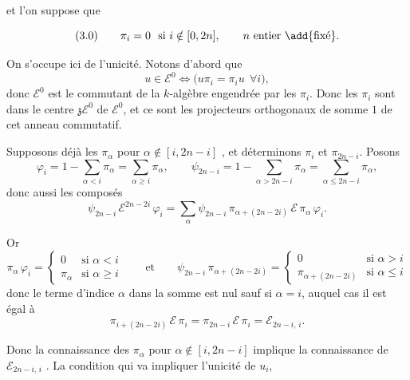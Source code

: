 
\struck{\ill{}} et  l'on suppose que

\[ (3.0) \qquad \pi_{i} = 0 \ \text{ si } i \notin [0, 2n], \qquad n \ \text{entier \add{fixé}} . \]

 On s'occupe ici de l'unicité.  Notons d'abord que
\[ u \in \mathcal{E}^{0} \iff \bigl( u \pi_{i} = \pi_{i} u \ \ \forall i \bigr) , \]
donc $\mathcal{E}^{0}$ est le commutant de la $k$-algèbre engendrée par les
$\pi_{i}$. Donc les $\pi_{i}$ sont dans le centre
$\mathfrak{z}\mathcal{E}^{0}$ de $\mathcal{E}^{0}$, et ce sont les projecteurs
 orthogonaux de somme $1$ de cet anneau commutatif.

Supposons  déjà les $\pi_{\alpha}$ pour
$\alpha \notin [i, 2n-i]$ , et déterminons $\pi_{i}$ et
$\pi_{2n-i}$. Posons
\[ \varphi_{i} = 1 - \sum_{\alpha < i} \pi_{\alpha} = \sum_{\alpha \geqslant i} \pi_{\alpha} , \qquad \psi_{2n-i} = 1 - \sum_{\alpha > 2n-i} \pi_{\alpha} = \sum_{\alpha \leqslant 2n-i} \pi_{\alpha} , \]
donc aussi les composés
\[ \psi_{2n-i}\, \mathcal{E}^{2n-2i}\, \varphi_{i} = \sum_{\alpha} \psi_{2n-i}\, \pi_{\alpha + (2n-2i)}\, \mathcal{E}\, \pi_{\alpha}\, \varphi_{i} . \]


Or
\[ \pi_{\alpha}\, \varphi_{i} = \begin{cases} 0 & \text{si } \alpha < i \\ \pi_{\alpha} & \text{si } \alpha \geqslant i \end{cases} \qquad \text{et} \qquad \psi_{2n-i}\, \pi_{\alpha+(2n-2i)} = \begin{cases} 0 & \text{si } \alpha > i \\ \pi_{\alpha+(2n-2i)} & \text{si } \alpha \leqslant i \end{cases} \]
donc le terme d'indice $\alpha$ dans la somme est nul sauf si $\alpha = i$,
auquel cas il est égal à
\[ \pi_{i+(2n-2i)}\, \mathcal{E}\, \pi_{i} = \pi_{2n-i}\, \mathcal{E}\, \pi_{i} = \mathcal{E}_{2n-i,\,i} . \]

Donc la connaissance des $\pi_{\alpha}$ pour $\alpha \notin [i, 2n-i]$ implique
la connaissance de $\mathcal{E}_{2n-i,\,i}$ . La condition qui
va impliquer l'unicité de $u_{i}$,

